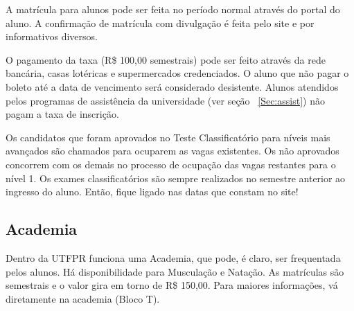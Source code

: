 \documentclass[a4paper,12pt,openany]{article}
\begin{document}
A matrícula para alunos pode ser feita no período normal através do portal do aluno. A confirmação de matrícula com divulgação é feita pelo site e por informativos diversos.

O pagamento da taxa (R\$ 100,00 semestrais) pode ser feito através da rede bancária, casas lotéricas e supermercados credenciados. O aluno que não pagar o boleto até a data de vencimento será considerado desistente. Alunos atendidos pelos programas de assistência da universidade (ver seção ~\ref{Sec:assist}) não pagam a taxa de inscrição.

Os candidatos que foram aprovados no Teste Classificatório para níveis mais avançados são chamados para ocuparem as vagas existentes. Os não aprovados concorrem com os demais no processo de ocupação das vagas restantes para o nível 1. Os exames classificatórios são sempre realizados no semestre anterior ao ingresso do aluno. Então, fique ligado nas datas que constam no site!



\subsection{Academia}

Dentro da UTFPR funciona uma Academia, que pode, é claro, ser frequentada pelos alunos. Há disponibilidade para Musculação e Natação. As matrículas são semestrais e o valor gira em torno de R\$ 150,00. Para maiores informações, vá diretamente na academia (Bloco T).




\end{document}
